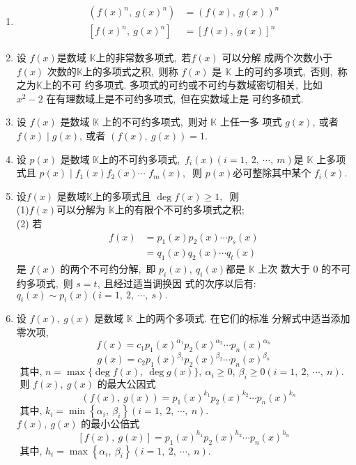 \begin{enumerate}
		\item
		$$\begin{aligned}
			\left(f(x)^{n},\  g(x)^{n}\right) &=(f(x),\  g(x))^{n} \\
			{\left[f(x)^{n},\  g(x)^{n}\right] } &=[f(x),\  g(x)]^{n}
		\end{aligned}$$
		\item 设 $ f(x)  $是数域 $ \mathbb{K}  $上的非常数多项式,\  若$  f(x) $ 可以分解 成两个次数小于$  f(x) $ 次数的$  \mathbb{K}  $上的多项式之积,\  则称  $f(x) $ 是 $ \mathbb{K}$  上的可约多项式,\  否则,\  称之为$  \mathbb{K}  $上的不可 约多项式. 多项式的可约或不可约与数域密切相关,\  比如 $ x^{2}-2 $ 在有理数域上是不可约多项式,\  但在实数域上是 可约多硕式.
		\item 设  $f(x) $ 是数域 $ \mathbb{K} $ 上的不可约多项式,\  则对  $\mathbb{K} $ 上任一多 项式  $g(x) ,\  $或者 $ f(x) \mid g(x) ,\  $或者  $(f(x),\  g(x))=1 .$
		\item 设  $p(x) $ 是数域 $ \mathbb{K}  $上的不可约多项式,\   $f_{i}(x)(i=   1,\ 2,\  \cdots,\  m)  $是 $ \mathbb{K} $ 上多项式且 $ p(x) \mid f_{1}(x) f_{2}(x) \cdots$ $f_{m}(x) ,\ $ 则 $ p(x)  $必可整除其中某个  $f_{i}(x) .$
		\item 设$  f(x) $ 是数域$  \mathbb{K}  $上的多项式且 $ \operatorname{deg} f(x) \geqslant 1 ,\ $ 则\\
		(1)$ f(x)  $可以分解为 $ \mathbb{K}  $上的有限个不可约多项式之积;\\
		(2) 若
		$$\begin{aligned}
			f(x) &=p_{1}(x) p_{2}(x) \cdots p_{s}(x) \\
			&=q_{1}(x) q_{2}(x) \cdots q_{t}(x)
		\end{aligned}$$
		是  $f(x)$  的两个不可约分解,\  即  $p_{i}(x),\  q_{i}(x)  $都是  $\mathbb{K} $ 上次 数大于 $0$ 的不可约多项式,\  则 $ s=t ,\ $且经过适当调换因 式的次序以后有:$ q_{i}(x) \sim p_{i}(x)(i=1,\ 2,\  \cdots,\  s) .$
		\item 设 $f(x),\  g(x)$  是数域 $ \mathbb{K}$  上的两个多项式. 在它们的标准 分解式中适当添加零次项,\ 
		$$f(x)=c_{1} p_{1}(x)^{\alpha_{1}} p_{2}(x)^{\alpha_{2}} \cdots p_{n}(x)^{\alpha_{n}}$$
		$$g(x)=c_{2} p_{1}(x)^{\beta_{1}} p_{2}(x)^{\beta_{2}} \cdots p_{n}(x)^{\beta_{n}}$$
		$\text { 其中,\  } n=\max \{\operatorname{deg} f(x),\  \operatorname{deg} g(x)\},\  \alpha_{i} \geqslant 0,\  \beta_{i} \geqslant 0(i=1,\ 2,\  \cdots,\  n) .$ \\
		$\text { 则 } f(x),\  g(x) \text { 的最大公因式 }$
		$$\quad(f(x),\  g(x))=p_{1}(x)^{k_{1}} p_{2}(x)^{k_{2}} \cdots p_{n}(x)^{k_{n}} $$
		$\text { 其中,\  } k_{i}=\min \left\{\alpha_{i},\  \beta_{i}\right\}(i=1,\ 2,\  \cdots,\  n) . $\\
		$f(x),\  g(x) \text { 的最小公倍式 }$
		$${[f(x),\  g(x)]=p_{1}(x)^{h_{1}} p_{2}(x)^{h_{2}} \cdots p_{n}(x)^{h_{n}}}$$
		$\text { 其中,\  } h_{i}=\max \left\{\alpha_{i},\  \beta_{i}\right\}(i=1,\ 2,\  \cdots,\  n) .$
		

\end{enumerate}
